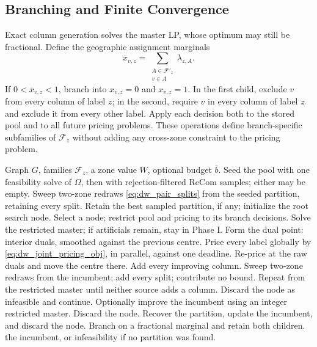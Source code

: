 \documentclass{article}
\begin{document}
\subsection{Branching and Finite Convergence}
\label{app:dw_convergence}
Exact column generation solves the master LP, whose optimum may still be
fractional. Define the geographic assignment marginals
\begin{equation}\label{eq:dw_marginal}
\overline x_{v,z}=\sum_{\substack{A\in\mathcal F'_z\\v\in A}}\lambda_{z,A}.
\end{equation}
If $0<\overline x_{v,z}<1$, branch into $x_{v,z}=0$ and $x_{v,z}=1$. In the
first child, exclude $v$ from every column of label $z$; in the second, require
$v$ in every column of label $z$ and exclude it from every other label. Apply
each decision both to the stored pool and to all future pricing problems. These
operations define branch-specific subfamilies of $\mathcal F_z$ without adding
any cross-zone constraint to the pricing problem.

\begin{algorithm}[t]
\caption{Anchored Zone-Column Branch-and-Price}
\label{alg:dw_mid}
\begin{algorithmic}[1]
\Require Graph $G$, families $\mathcal F_z$, a zone value $W$, optional budget $\overline b$.
\State Seed the pool with one feasibility solve of $\Omega$, then with rejection-filtered ReCom samples; either may be empty.
\State Sweep two-zone redraws \eqref{eq:dw_pair_splits} from the seeded partition, retaining every split.
\State Retain the best sampled partition, if any; initialize the root search node.
    \State Select a node; restrict pool and pricing to its branch decisions.
    \State Solve the restricted master; if artificials remain, stay in Phase I.
    \State Form the dual point: interior duals, smoothed against the previous centre.
    \State Price every label globally by \eqref{eq:dw_joint_pricing_obj}, in parallel, against one deadline.
        \State Re-price at the raw duals and move the centre there.
    \EndIf
    \State Add every improving column.
        \State Sweep two-zone redraws from the incumbent; add every split; contribute no bound.
    \EndIf
    \State Repeat from the restricted master until neither source adds a column.
        \State Discard the node as infeasible and continue.
    \EndIf
    \State Optionally improve the incumbent using an integer restricted master.
        \State Discard the node.
        \State Recover the partition, update the incumbent, and discard the node.
    \Else
        \State Branch on a fractional marginal and retain both children.
    \EndIf
\EndWhile
\State \Return the incumbent, or infeasibility if no partition was found.
\end{algorithmic}
\end{algorithm}
\end{document}
